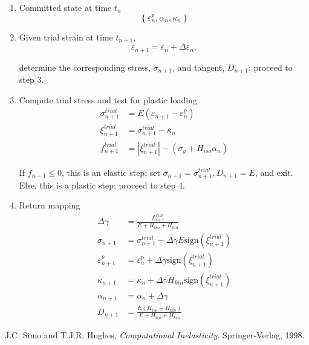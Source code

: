 \documentclass[12pt]{article}
\begin{document}
\begin{enumerate}

\item{} Committed state at time $t_n$
\begin{equation}
\left\{ \varepsilon_n^p, \alpha_n, \kappa_n \right\}
\end{equation}

\item{} Given trial strain at time $t_{n+1}$,
\begin{equation}
\varepsilon_{n+1} = \varepsilon_n + \Delta\varepsilon_n,
\end{equation}

\noindent determine the corresponding stress, $\sigma_{n+1}$, and
tangent, $D_{n+1}$; proceed to step 3.

\item{} Compute trial stress and test for plastic loading
\begin{align}
\sigma_{n+1}^{trial} &= E \left( \varepsilon_{n+1} - \varepsilon_n^p \right) \\
\xi_{n+1}^{trial} &= \sigma_{n+1}^{trial} - \kappa_n \\
f_{n+1}^{trial} &= \left| \xi_{n+1}^{trial} \right| -
                  \left( \sigma_y + H_{iso}\alpha_n \right)
\end{align}

\begin{center}
If $f_{n+1} \leq 0$, this is an elastic step; set
$\sigma_{n+1} = \sigma_{n+1}^{trial}, D_{n+1} = E$, and exit. \\
Else, this is a plastic step; proceed to step 4.
\end{center}

\item{} Return mapping
\begin{align}
\Delta\gamma &= \frac{f_{n+1}^{trial}}{E+H_{iso}+H_{kin}} \\
\sigma_{n+1} &= \sigma_{n+1}^{trial} - \Delta\gamma E \mbox{sign}(\xi_{n+1}^{trial}) \\
\varepsilon_{n+1}^p &= \varepsilon_n^p + \Delta\gamma \mbox{sign}(\xi_{n+1}^{trial}) \\
\kappa_{n+1} &= \kappa_n + \Delta\gamma H_{kin} \mbox{sign}(\xi_{n+1}^{trial}) \\
\alpha_{n+1} &= \alpha_n + \Delta\gamma \\
D_{n+1} &= \frac{E(H_{iso}+H_{kin})}{E+H_{iso}+H_{kin}}
\end{align}

\end{enumerate}

\begin{thebibliography}{99}
 J.C. Simo and T.J.R. Hughes,
\emph{Computational Inelasticity}. Springer-Verlag, 1998.
\end{thebibliography}
\end{document}
